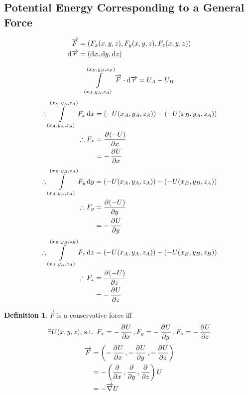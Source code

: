 \documentclass[fleqn]{article}
\theoremstyle{definition}
\newtheorem{definition}{Definition}
\theoremstyle{theorem}
\begin{document}
\subsection{Potential Energy Corresponding to a General Force}

\begin{align*}
	\overrightarrow{F} &= (F_x (x, y, z), F_y (x, y, z), F_z (x, y, z)) \\
	\dif \overrightarrow{r} &= (\dif x, \dif y, \dif z)
\end{align*}

\begin{align*}
	\int\displaylimits_{(x_A, y_A, z_A)}^{(x_B, y_B, z_B)} \overrightarrow{F} \cdot \dif \overrightarrow{r} &= U_A - U_B \\
\end{align*}
\begin{align*}
	\therefore \int\displaylimits_{(x_A, y_A, z_A)}^{(x_B, y_A, z_A)} F_x \dif x &= (-U(x_A, y_A, z_A)) - (-U(x_B, y_A, z_A)) \\
	\therefore F_x &= \dpd{(-U)}{x} \\
	&= - \dpd{U}{x}
\end{align*}
\begin{align*}
	\therefore \int\displaylimits_{(x_A, y_A, z_A)}^{(x_B, y_B, z_A)} F_y \dif y &= (-U(x_A, y_A, z_A)) - (-U(x_B, y_B, z_A)) \\
	\therefore F_y &= \dpd{(-U)}{y} \\
	&= - \dpd{U}{y}
\end{align*}
\begin{align*}
	\therefore \int\displaylimits_{(x_A, y_A, z_A)}^{(x_B, y_B, z_B)} F_z \dif z &= (-U(x_A, y_A, z_A)) - (-U(x_B, y_B, z_B)) \\
	\therefore F_z &= \dpd{(-U)}{z} \\
	&= - \dpd{U}{z}
\end{align*}

\begin{definition}
	$\overrightarrow{F}$ is a conservative force iff 
	\begin{equation*}
		\exists U(x, y, z)$, s.t. $F_x = - \dpd{U}{x} , F_y = - \dpd{U}{y} , F_z = - \dpd{U}{z}
	\end{equation*}
	\begin{align*}
		\overrightarrow{F} &= \left(- \dpd{U}{x} , - \dpd{U}{y} , - \dpd{U}{z}\right) \\
		&= -\left(\dpd{}{x} , \dpd{}{y} , \dpd{}{z}\right) U \\
		&= - \overrightarrow{\nabla} U
	\end{align*}
\end{definition}
\end{document}
